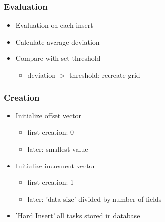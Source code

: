 \begin{frame}
	\frametitle{Evaluation}
		\begin{itemize}
			\item<2-> {Evaluation on each insert}
			\item<3-> {Calculate average deviation}
			\item<4-> {Compare with set threshold}
			\begin{itemize}
				\item<5->{deviation $>$ threshold: recreate grid}
			\end{itemize}
		\end{itemize}
\end{frame}	
	
\begin{frame}
	\frametitle{Creation}
		\begin{itemize}
			\item<2-> {Initialize offset vector}
			\begin{itemize}
				\item<3-> {first creation: 0}
				\item<4-> {later: smallest value}
			\end{itemize}
			\item<5-> {Initialize increment vector}
			\begin{itemize}
				\item<6->{first creation: 1}
				\item<7->{later: 'data size' divided by number of fields}
			\end{itemize}
			\item<8-> {'Hard Insert' all tasks stored in database}			
		\end{itemize}
\end{frame}


